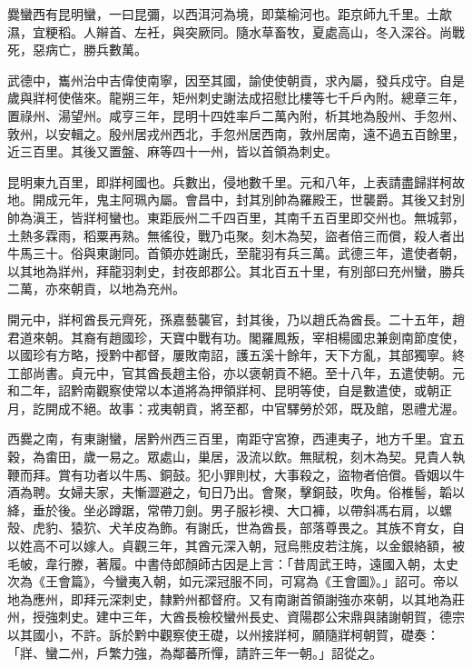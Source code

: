 \begin{pinyinscope}
 爨蠻西有昆明蠻，一曰昆彌，以西洱河為境，即葉榆河也。距京師九千里。土歊濕，宜粳稻。人辮首、左衽，與突厥同。隨水草畜牧，夏處高山，冬入深谷。尚戰死，惡病亡，勝兵數萬。



 武德中，巂州治中吉偉使南寧，因至其國，諭使使朝貢，求內屬，發兵戍守。自是歲與牂柯使偕來。龍朔三年，矩州刺史謝法成招慰比樓等七千戶內附。總章三年，置祿州、湯望州。咸亨三年，昆明十四姓率戶二萬內附，析其地為殷州、手忽州、敦州，以安輯之。殷州居戎州西北，手忽州居西南，敦州居南，遠不過五百餘里，近三百里。其後又置盤、麻等四十一州，皆以首領為刺史。



 昆明東九百里，即牂柯國也。兵數出，侵地數千里。元和八年，上表請盡歸牂柯故地。開成元年，鬼主阿珮內屬。會昌中，封其別帥為羅殿王，世襲爵。其後又封別帥為滇王，皆牂柯蠻也。東距辰州二千四百里，其南千五百里即交州也。無城郭，土熱多霖雨，稻粟再熟。無徭役，戰乃屯聚。刻木為契，盜者倍三而償，殺人者出牛馬三十。俗與東謝同。首領亦姓謝氏，至龍羽有兵三萬。武德三年，遣使者朝，以其地為牂州，拜龍羽刺史，封夜郎郡公。其北百五十里，有別部曰充州蠻，勝兵二萬，亦來朝貢，以地為充州。



 開元中，牂柯酋長元齊死，孫嘉藝襲官，封其後，乃以趙氏為酋長。二十五年，趙君道來朝。其裔有趙國珍，天寶中戰有功。閣羅鳳叛，宰相楊國忠兼劍南節度使，以國珍有方略，授黔中都督，屢敗南詔，護五溪十餘年，天下方亂，其部獨寧。終工部尚書。貞元中，官其酋長趙主俗，亦以褒朝貢不絕。至十八年，五遣使朝。元和二年，詔黔南觀察使常以本道將為押領牂柯、昆明等使，自是數遣使，或朝正月，訖開成不絕。故事：戎夷朝貢，將至都，中官驛勞於郊，既及館，恩禮尤渥。



 西爨之南，有東謝蠻，居黔州西三百里，南距守宮獠，西連夷子，地方千里。宜五穀，為畬田，歲一易之。眾處山，巢居，汲流以飲。無賦稅，刻木為契。見貴人執鞭而拜。賞有功者以牛馬、銅鼓。犯小罪則杖，大事殺之，盜物者倍償。昏姻以牛酒為聘。女婦夫家，夫慚澀避之，旬日乃出。會聚，擊銅鼓，吹角。俗椎髻，韜以絳，垂於後。坐必蹲踞，常帶刀劍。男子服衫襖、大口褲，以帶斜馮右肩，以螺殼、虎豹、猿狖、犬羊皮為飾。有謝氏，世為酋長，部落尊畏之。其族不育女，自以姓高不可以嫁人。貞觀三年，其酋元深入朝，冠烏熊皮若注旄，以金銀絡額，被毛帔，韋行滕，著履。中書侍郎顏師古因是上言：「昔周武王時，遠國入朝，太史次為《王會篇》，今蠻夷入朝，如元深冠服不同，可寫為《王會圖》。」詔可。帝以地為應州，即拜元深刺史，隸黔州都督府。又有南謝首領謝強亦來朝，以其地為莊州，授強刺史。建中三年，大酋長檢校蠻州長史、資陽郡公宋鼎與諸謝朝賀，德宗以其國小，不許。訴於黔中觀察使王礎，以州接牂柯，願隨牂柯朝賀，礎奏：「牂、蠻二州，戶繁力強，為鄰蕃所憚，請許三年一朝。」詔從之。




\end{pinyinscope}
